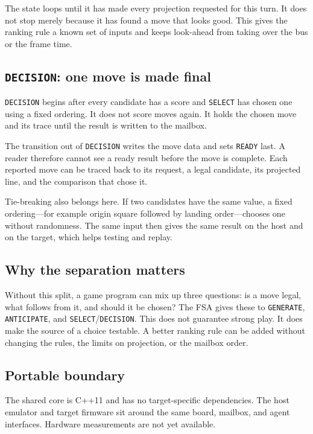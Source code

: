 \documentclass[11pt]{article}
\begin{document}
The state loops until it has made every projection requested for this turn. It
does not stop merely because it has found a move that looks good. This gives
the ranking rule a known set of inputs and keeps look-ahead from taking over
the bus or the frame time.

\subsection{\texttt{DECISION}: one move is made final}

\texttt{DECISION} begins after every candidate has a score and
\texttt{SELECT} has chosen one using a fixed ordering. It does not score moves
again. It holds the chosen move and its trace until the result is written to
the mailbox.

The transition out of \texttt{DECISION} writes the move data and sets
\texttt{READY} last. A reader therefore cannot see a ready result before the
move is complete. Each reported move can be traced back to its request, a
legal candidate, its projected line, and the comparison that chose it.

Tie-breaking also belongs here. If two candidates have the same value, a fixed
ordering---for example origin square followed by landing order---chooses one
without randomness. The same input then gives the same result on the host and
on the target, which helps testing and replay.

\subsection{Why the separation matters}

Without this split, a game program can mix up three questions: is a move
legal, what follows from it, and should it be chosen? The FSA gives these to
\texttt{GENERATE}, \texttt{ANTICIPATE}, and
\texttt{SELECT}/\texttt{DECISION}. This does not guarantee strong play. It
does make the source of a choice testable. A better ranking rule can be added
without changing the rules, the limits on projection, or the mailbox order.

\subsection{Portable boundary}

The shared core is C++11 and has no target-specific dependencies. The host
emulator and target firmware sit around the same board, mailbox, and agent
interfaces. Hardware measurements are not yet available.
\end{document}
